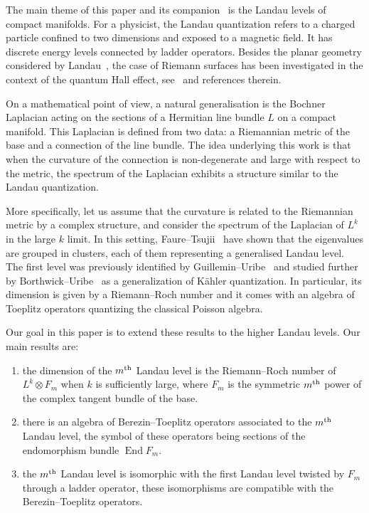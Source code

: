\documentclass[10pt,a4paper]{article}
\theoremstyle{definition}
\numberwithin{equation}{section}
\newcommand{\op}{\operatorname}
\begin{document}
The main theme of this paper and its companion~\cite{oim_copain} is the Landau levels of compact manifolds. For a physicist, the Landau quantization refers to a charged particle confined to two dimensions and exposed to a magnetic field. It has discrete energy levels connected by ladder operators. Besides the planar geometry considered by Landau~\cite{La30}, the case of Riemann surfaces has been investigated in the context of the quantum Hall effect, see~\cite{IeLi94} and references therein.

On a mathematical point of view, a natural generalisation is the Bochner Laplacian acting on the sections of a Hermitian line bundle $L$ on a compact manifold. This Laplacian is defined from two data: a Riemannian metric of the base and a connection of the line bundle. The idea underlying this work is that when the curvature of the connection is non-degenerate and large with respect to the metric, the spectrum of the Laplacian exhibits a structure similar to the Landau quantization.

More specifically, let us assume that the curvature is related to the Riemannian metric by a complex structure, and consider the spectrum of the Laplacian of $L^{k}$ in the large $k$ limit. In this setting, Faure--Tsujii~\cite{FaTs15} have shown that the eigenvalues are grouped in clusters, each of them representing a generalised Landau level. The first level was previously identified by Guillemin--Uribe~\cite{GuUr88} and studied further by Borthwick--Uribe~\cite{BoUr96} as a generalization of K\"ahler quantization. In particular, its dimension is given by a Riemann--Roch number and it comes with an algebra of Toeplitz operators quantizing the classical Poisson algebra.

Our goal in this paper is to extend these results to the higher Landau levels. Our main results are:
\begin{enumerate}
\item the dimension of the $m^{\rm th}$ Landau level is the Riemann--Roch number of $L^k \otimes F_m$ when $k$ is sufficiently large, where $F_m$ is the symmetric $m^{\rm th}$ power of the complex tangent bundle of the base.
\item there is an algebra of Berezin--Toeplitz operators associated to the $m^{\rm th}$ Landau level, the symbol of these operators being sections of the endomorphism bundle $\op{End} F_m$.
\item the $m^{\rm th}$ Landau level is isomorphic with the first Landau level twisted by $F_m$ through a ladder operator, these isomorphisms are compatible with the Berezin--Toeplitz operators.
\end{enumerate}
\end{document}
